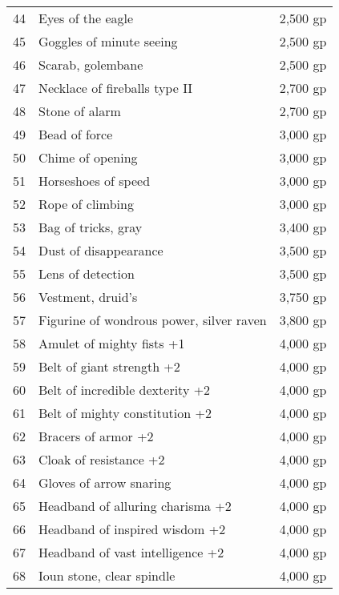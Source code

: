 \begin{table}[]
\begin{tabularx}{\linewidth}{lXl}
44  & Eyes of the eagle                           & 2,500 gp     \\
45  & Goggles of minute seeing                    & 2,500 gp     \\
46  & Scarab, golembane                           & 2,500 gp     \\
47  & Necklace of fireballs type II               & 2,700 gp     \\
48  & Stone of alarm                              & 2,700 gp     \\
49  & Bead of force                               & 3,000 gp     \\
50  & Chime of opening                            & 3,000 gp     \\
51  & Horseshoes of speed                         & 3,000 gp     \\
52  & Rope of climbing                            & 3,000 gp     \\
53  & Bag of tricks, gray                         & 3,400 gp     \\
54  & Dust of disappearance                       & 3,500 gp     \\
55  & Lens of detection                           & 3,500 gp     \\
56  & Vestment, druid's                           & 3,750 gp     \\
57  & Figurine of wondrous power, silver raven    & 3,800 gp     \\
58  & Amulet of mighty fists +1                   & 4,000 gp     \\
59  & Belt of giant strength +2                   & 4,000 gp     \\
60  & Belt of incredible dexterity +2             & 4,000 gp     \\
61  & Belt of mighty constitution +2              & 4,000 gp     \\
62  & Bracers of armor +2                         & 4,000 gp     \\
63  & Cloak of resistance +2                      & 4,000 gp     \\
64  & Gloves of arrow snaring                     & 4,000 gp     \\
65  & Headband of alluring charisma +2            & 4,000 gp     \\
66  & Headband of inspired wisdom +2              & 4,000 gp     \\
67  & Headband of vast intelligence +2            & 4,000 gp     \\
68  & Ioun stone, clear spindle                   & 4,000 gp     \\

\end{tabularx}
\end{table}

